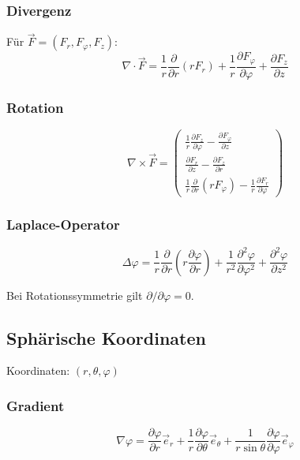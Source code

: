 \documentclass[a4paper]{article}
\begin{document}
\subsubsection{Divergenz}

Für $\vec F = (F_r,F_\varphi,F_z)$:
\[
\nabla \cdot \vec F =
\frac{1}{r}\frac{\partial}{\partial r}(rF_r)
+\frac{1}{r}\frac{\partial F_\varphi}{\partial \varphi}
+\frac{\partial F_z}{\partial z}
\]

\subsubsection{Rotation}

\[
\nabla \times \vec F =
\begin{pmatrix}
\frac{1}{r}\frac{\partial F_z}{\partial \varphi}-\frac{\partial F_\varphi}{\partial z} \\
\frac{\partial F_r}{\partial z}-\frac{\partial F_z}{\partial r} \\
\frac{1}{r}\frac{\partial}{\partial r}(rF_\varphi)-\frac{1}{r}\frac{\partial F_r}{\partial \varphi}
\end{pmatrix}
\]

\subsubsection{Laplace-Operator}

\[
\Delta \varphi =
\frac{1}{r}\frac{\partial}{\partial r}
\left(r\frac{\partial \varphi}{\partial r}\right)
+\frac{1}{r^2}\frac{\partial^2 \varphi}{\partial \varphi^2}
+\frac{\partial^2 \varphi}{\partial z^2}
\]

\begin{checkitem}
Bei Rotationssymmetrie gilt $\partial/\partial \varphi = 0$.
\end{checkitem}

\subsection{Sphärische Koordinaten}

Koordinaten: $(r,\theta,\varphi)$

\subsubsection{Gradient}

\[
\nabla \varphi =
\frac{\partial \varphi}{\partial r}\vec e_r
+\frac{1}{r}\frac{\partial \varphi}{\partial \theta}\vec e_\theta
+\frac{1}{r\sin\theta}\frac{\partial \varphi}{\partial \varphi}\vec e_\varphi
\]
\end{document}
